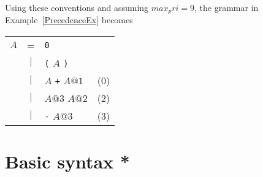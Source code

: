 Using these conventions and assuming $max_pri=9$, the grammar in
Example~\ref{PrecedenceEx} becomes
\begin{center}
\begin{tabular}{rclc}
$A$ & = & {\tt0} & \hspace*{4em} \\
 & $|$ & {\tt(} $A$ {\tt)} \\
 & $|$ & $A$ {\tt+} $A@1$ & (0) \\
 & $|$ & $A@3$ {\tt*} $A@2$ & (2) \\
 & $|$ & {\tt-} $A@3$ & (3)
\end{tabular}
\end{center}


\section{Basic syntax *}

